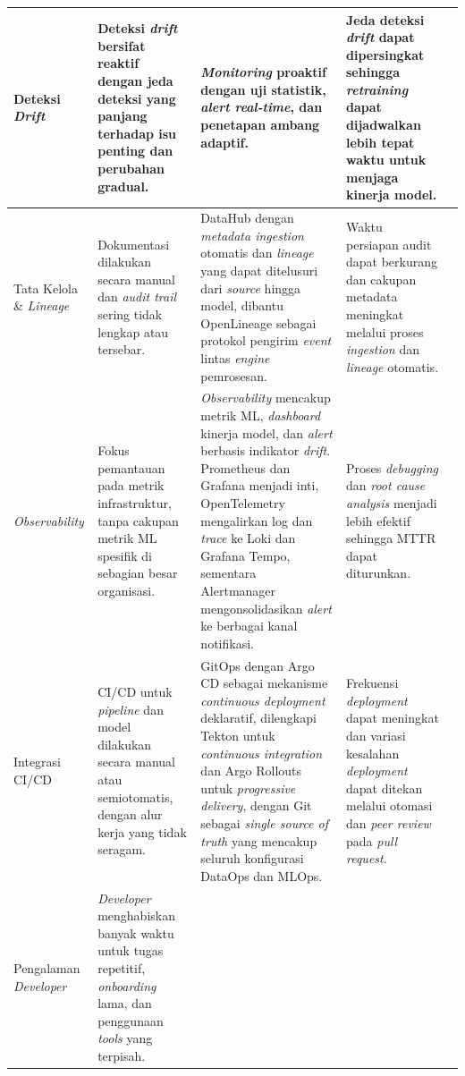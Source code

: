 {\begin{longtable}{|m{2cm}|m{2.7cm}|m{2.7cm}|m{3.05cm}|m{2cm}|}
\hline
Deteksi \textit{Drift} &
Deteksi \textit{drift} bersifat reaktif dengan jeda deteksi yang panjang terhadap isu penting dan perubahan gradual. &
\textit{Monitoring} proaktif dengan uji statistik, \textit{alert real-time}, dan penetapan ambang adaptif. &
Jeda deteksi \textit{drift} dapat dipersingkat sehingga \textit{retraining} dapat dijadwalkan lebih tepat waktu untuk menjaga kinerja model. &
\autocite{cespedes2024efficient,bayram2022concept} \\
\hline
Tata Kelola \& \textit{Lineage} &
Dokumentasi dilakukan secara manual dan \textit{audit trail} sering tidak lengkap atau tersebar. &
DataHub dengan \textit{metadata ingestion} otomatis dan \textit{lineage} yang dapat ditelusuri dari \textit{source} hingga model, dibantu OpenLineage sebagai protokol pengirim \textit{event} lintas \textit{engine} pemrosesan. &
Waktu persiapan audit dapat berkurang dan cakupan metadata meningkat melalui proses \textit{ingestion} dan \textit{lineage} otomatis. &
\autocite{stoyanovich2020responsible,lamer2024data} \\
\hline
\textit{Observability} &
Fokus pemantauan pada metrik infrastruktur, tanpa cakupan metrik ML spesifik di sebagian besar organisasi. &
\textit{Observability} mencakup metrik ML, \textit{dashboard} kinerja model, dan \textit{alert} berbasis indikator \textit{drift}. Prometheus dan Grafana menjadi inti, OpenTelemetry mengalirkan log dan \textit{trace} ke Loki dan Grafana Tempo, sementara Alertmanager mengonsolidasikan \textit{alert} ke berbagai kanal notifikasi. &
Proses \textit{debugging} dan \textit{root cause analysis} menjadi lebih efektif sehingga MTTR dapat diturunkan. &
\autocite{shankar2022operationalizing} \\
\hline
Integrasi CI/CD &
CI/CD untuk \textit{pipeline} dan model dilakukan secara manual atau semiotomatis, dengan alur kerja yang tidak seragam. &
GitOps dengan Argo CD sebagai mekanisme \textit{continuous deployment} deklaratif, dilengkapi Tekton untuk \textit{continuous integration} dan Argo Rollouts untuk \textit{progressive delivery}, dengan Git sebagai \textit{single source of truth} yang mencakup seluruh konfigurasi DataOps dan MLOps. &
Frekuensi \textit{deployment} dapat meningkat dan variasi kesalahan \textit{deployment} dapat ditekan melalui otomasi dan \textit{peer review} pada \textit{pull request}. &
\autocite{kreuzberger2023mlops} \\
\hline
Pengalaman \textit{Developer} &
\textit{Developer} menghabiskan banyak waktu untuk tugas repetitif, \textit{onboarding} lama, dan penggunaan \textit{tools} yang terpisah. &

\end{longtable}}

